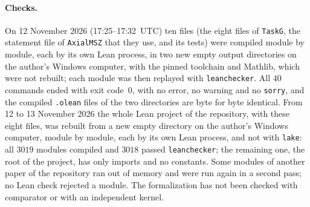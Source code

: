 \documentclass[11pt]{article}
\theoremstyle{remark}
\begin{document}
\paragraph{Checks.}
On 12 November 2026 (17:25--17:32~UTC) ten files (the eight files of
\texttt{TaskG}, the statement file of \texttt{AxialMSZ} that they use, and its
tests) were compiled
module by module, each by its own Lean process, in two new empty output directories on the author's
Windows computer, with the pinned toolchain and Mathlib, which were not
rebuilt; each module was then replayed with \texttt{leanchecker}. All $40$
commands ended with exit code~$0$, with no error, no warning and no
\texttt{sorry}, and the compiled \texttt{.olean} files of the two directories
are byte for byte identical. From 12 to 13 November 2026 the whole Lean project
of the repository, with these eight files, was rebuilt from a new empty directory
on the author's Windows computer, module by module, each by its own Lean
process, and not with \texttt{lake}: all $3019$ modules compiled and $3018$ passed
\texttt{leanchecker}; the remaining one, the root of the project, has only
imports and no constants. Some modules of another paper of the repository ran
out of memory and were run again in a second pass; no Lean check rejected a
module. The formalization has not been checked
with comparator or with an independent kernel.
\end{document}
